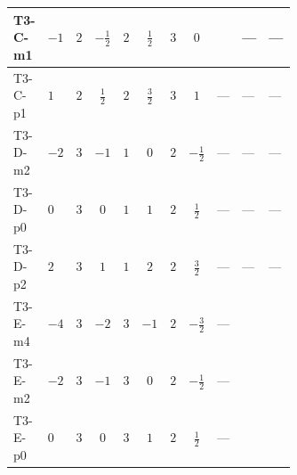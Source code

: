 \documentclass[8pt]{article}
\begin{document}
\begin{landscape}
\begin{longtable}{@{}llcccccc >{\raggedright\arraybackslash}p{0.21\linewidth} >{\raggedright\arraybackslash}p{0.21\linewidth} >{\raggedright\arraybackslash}p{0.21\linewidth}@{}}
T3-C-m1 & $-1$ & $2$ & $-\frac{1}{2}$ & $2$ & $\frac{1}{2}$ & $3$ & $0$ & \scriptsize\adjustbox{max width=\linewidth}{$\begin{gathered} -\frac{8}{3} \operatorname{Tr}\!\left({y_1}\,\left({y_2}\right)^{\dagger}\,{y_2}\,\left({y_1}\right)^{\dagger}\right)\end{gathered}$} & --- & --- \\
\midrule
T3-C-p1 & $1$ & $2$ & $\frac{1}{2}$ & $2$ & $\frac{3}{2}$ & $3$ & $1$ & --- & --- & --- \\
\midrule
T3-D-m2 & $-2$ & $3$ & $-1$ & $1$ & $0$ & $2$ & $-\frac{1}{2}$ & --- & --- & --- \\
\midrule
T3-D-p0 & $0$ & $3$ & $0$ & $1$ & $1$ & $2$ & $\frac{1}{2}$ & --- & --- & --- \\
\midrule
T3-D-p2 & $2$ & $3$ & $1$ & $1$ & $2$ & $2$ & $\frac{3}{2}$ & --- & --- & --- \\
\midrule
T3-E-m4 & $-4$ & $3$ & $-2$ & $3$ & $-1$ & $2$ & $-\frac{3}{2}$ & --- & \scriptsize\adjustbox{max width=\linewidth}{$\begin{gathered} {\lambda_{12}^{(A)}} \left(2 T_{\nu}^{(1)}+2 T_{\nu}^{(2)}+\frac{16 {\lambda_{12}^{(\times)}}}{3}\right)\end{gathered}$} & \scriptsize\adjustbox{max width=\linewidth}{$\begin{gathered} +16 {\lambda_{12}^{(A)}} {\lambda_{S_1}^{(A)}}\end{gathered}$} \\
\midrule
T3-E-m2 & $-2$ & $3$ & $-1$ & $3$ & $0$ & $2$ & $-\frac{1}{2}$ & --- & \scriptsize\adjustbox{max width=\linewidth}{$\begin{gathered} {\lambda_{12}^{(A)}} \left(2 T_{\nu}^{(1)}+2 T_{\nu}^{(2)}+\frac{16 {\lambda_{12}^{(\times)}}}{3}\right)\end{gathered}$} & \scriptsize\adjustbox{max width=\linewidth}{$\begin{gathered} +16 {\lambda_{12}^{(A)}} {\lambda_{S_1}^{(A)}}\end{gathered}$} \\
\midrule
T3-E-p0 & $0$ & $3$ & $0$ & $3$ & $1$ & $2$ & $\frac{1}{2}$ & --- & \scriptsize\adjustbox{max width=\linewidth}{$\begin{gathered} {\lambda_{12}^{(A)}} \left(2 T_{\nu}^{(1)}+2 T_{\nu}^{(2)}+\frac{16 {\lambda_{12}^{(\times)}}}{3}\right)\end{gathered}$} & \scriptsize\adjustbox{max width=\linewidth}{$\begin{gathered} +16 {\lambda_{12}^{(A)}} {\lambda_{S_1}^{(A)}}\end{gathered}$} \\

\end{longtable}
\end{landscape}
\end{document}
